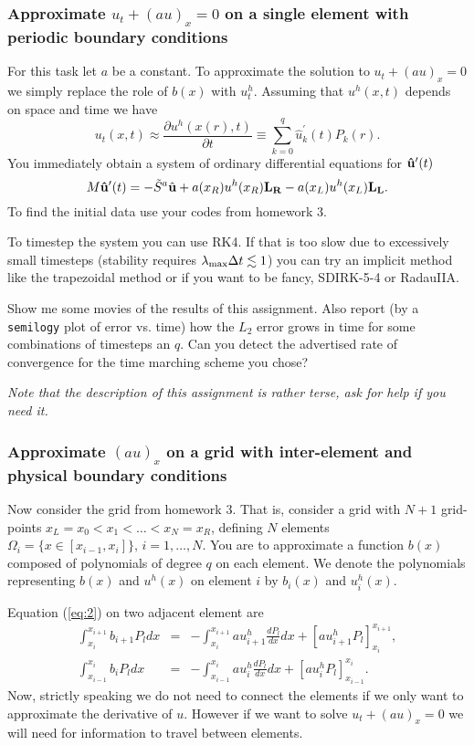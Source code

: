 \documentclass[12pt]{article}
\newcommand{\be}{\begin{equation}}
\newcommand{\ee}{\end{equation}}
\newcommand{\pa}{\partial}
\begin{document}
\subsubsection*{Approximate $u_t + (au)_x = 0$ on a single element with periodic boundary conditions} 
For this task let $a$ be a constant. To approximate the solution to $u_t + (au)_x = 0$ we simply replace the role of $b(x)$ with $u^h_t$. Assuming that $u^h(x,t)$ depends on space and time we have 
\be
u_t(x,t) \approx \frac{\pa u^h(x(r),t)}{\pa t} \equiv \sum_{k=0}^{q} \hat{u}^\prime_k(t) P_k(r).
\ee   
You immediately obtain a system of ordinary differential equations for ${\bf \hat{u}}^\prime(t) $
\be
M {\bf \hat{u}}^\prime(t) = -\tilde{S}^a \hat{{\bf u}} + a(x_R) u^h(x_R){\bf L_R} - a(x_L) u^h(x_L){\bf L_L}.
\ee
To find the initial data use your codes from homework 3. 


To timestep the system you can use RK4. If that is too slow due to excessively small timesteps (stability requires $\lambda_{\rm max} \Delta t  \lesssim 1 $) you can try an implicit method like the trapezoidal method or if you want to be fancy, SDIRK-5-4 or RadauIIA.

Show me some movies of the results of this assignment. Also report (by a \verb+semilogy+ plot of error vs. time) how the $L_2$ error grows in time for some combinations of timesteps an $q$. Can you detect the advertised rate of convergence for the time marching scheme you chose?  

{\em Note that the description of this assignment is rather terse, ask for help if you need it.}

\subsubsection*{Approximate $(au)_x$ on a grid with inter-element and physical boundary conditions} 
Now consider the grid from homework 3. That is, consider a grid with $N+1$ grid-points $x_L = x_0 < x_1 < \ldots < x_N = x_R$, defining $N$ elements $\Omega_i = \{x \in [x_{i-1},x_i]\}, \, i = 1,\ldots,N$. You are to approximate a function $b(x)$ composed of polynomials of degree $q$ on each element. We denote the polynomials representing $b(x)$ and $u^h(x)$ on element $i$ by $b_i(x)$ and $u^h_i(x)$. 

Equation (\ref{eq:2}) on two adjacent element are 
\begin{eqnarray}
\int_{x_{i}}^{x_{i+1}} b_{i+1} P_l  dx &=& - \int_{x_{i}}^{x_{i+1}} au_{i+1}^h \frac{d P_l}{dx}  dx +  \left[au_{i+1}^h P_l  \right]_{x_{i}}^{x_{i+1}}, \\
\int_{x_{i-1}}^{x_{i}} b_i P_l  dx &=& - \int_{x_{i-1}}^{x_i} au_i^h \frac{d P_l}{dx}  dx +  \left[au_{i}^h P_l  \right]_{x_{i-1}}^{x_{i}}. 
\end{eqnarray}
Now, strictly speaking we do not need to connect the elements if we only want to approximate the derivative of $u$. However if we want to solve $u_t+(au)_x = 0$ we will need for information to travel between elements. 
\end{document}

